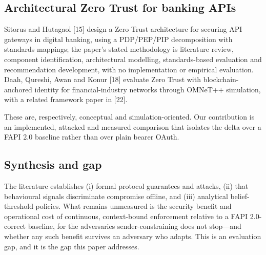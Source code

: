 \subsection{Architectural Zero Trust for banking APIs}

Sitorus and Hutagaol [15] design a Zero Trust architecture for securing API gateways in digital banking, using a PDP/PEP/PIP decomposition with standards mappings; the paper's stated methodology is literature review, component identification, architectural modelling, standards-based evaluation and recommendation development, with no implementation or empirical evaluation. Daah, Qureshi, Awan and Konur [18] evaluate Zero Trust with blockchain-anchored identity for financial-industry networks through OMNeT++ simulation, with a related framework paper in [22].

These are, respectively, conceptual and simulation-oriented. Our contribution is an implemented, attacked and measured comparison that isolates the delta over a FAPI 2.0 baseline rather than over plain bearer OAuth.

\subsection{Synthesis and gap}

The literature establishes (i) formal protocol guarantees and attacks, (ii) that behavioural signals discriminate compromise offline, and (iii) analytical belief-threshold policies. What remains unmeasured is the security benefit and operational cost of continuous, context-bound enforcement relative to a FAPI 2.0-correct baseline, for the adversaries sender-constraining does not stop---and whether any such benefit survives an adversary who adapts. This is an evaluation gap, and it is the gap this paper addresses.

